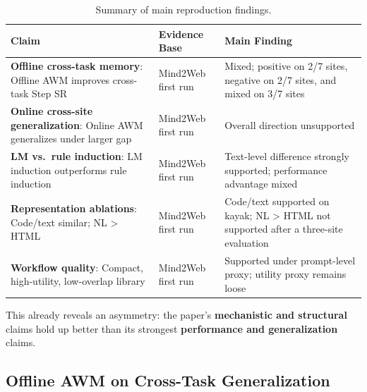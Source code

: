 \documentclass{article}
\begin{document}
{\begin{longtable}[]{@{}
  >{\raggedright\arraybackslash}p{}
  >{\raggedright\arraybackslash}p{}
  >{\raggedright\arraybackslash}p{}@{}}
\caption{Summary of main reproduction findings.}\label{tab:summary-of-main-reproduction-findings}\\

\toprule\noalign{}
\begin{minipage}[b]{\linewidth}\raggedright
Claim
\end{minipage} & \begin{minipage}[b]{\linewidth}\raggedright
Evidence Base
\end{minipage} & \begin{minipage}[b]{\linewidth}\raggedright
Main Finding
\end{minipage} \\
\midrule\noalign{}
\endhead
\bottomrule\noalign{}
\endlastfoot
\textbf{Offline cross-task memory}: Offline AWM improves cross-task Step SR & Mind2Web first run &
Mixed; positive on 2/7 sites, negative on 2/7 sites, and mixed on 3/7
sites \\
\textbf{Online cross-site generalization}: Online AWM generalizes under larger gap & Mind2Web first run &
Overall direction unsupported \\
\textbf{LM vs.~rule induction}: LM induction outperforms rule induction & Mind2Web first run &
Text-level difference strongly supported; performance
advantage mixed \\
\textbf{Representation ablations}: Code/text similar; NL \textgreater{} HTML & Mind2Web first run &
Code/text supported on kayak; NL \textgreater{} HTML not
supported after a three-site evaluation \\
\textbf{Workflow quality}: Compact, high-utility, low-overlap library & Mind2Web first run &
Supported under prompt-level proxy; utility proxy remains
loose \\
\end{longtable}
}

This already reveals an asymmetry: the paper's \textbf{mechanistic and
structural} claims hold up better than its strongest \textbf{performance
and generalization} claims.

\subsection{Offline AWM on Cross-Task
Generalization}\label{c1-offline-awm-on-cross-task-generalization}
\end{document}
